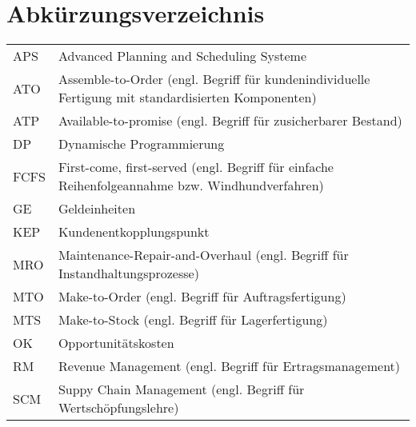\documentclass[a4paper,12pt,normalheadings,footexclude,headinclude,liststotoc,nochapterprefix,onecolumn,oneside,parskip,pointlessnumbers]{scrreprt}
\begin{document}
\chapter*{Abkürzungsverzeichnis}
\begin{table}[h!]
    \vspace*{-3mm}
    \hspace*{2mm}
  \renewcommand{\arraystretch}{1,5}
  \begin{flushleft}
    \begin{tabular}{lp{11.5cm}}  %
        APS & Advanced Planning and Scheduling Systeme \\
        ATO & Assemble-to-Order (engl. Begriff für kundenindividuelle Fertigung mit standardisierten Komponenten)\\
        ATP & Available-to-promise (engl. Begriff für zusicherbarer Bestand)\\
        DP  			 & Dynamische Programmierung\\
        FCFS & First-come, first-served (engl. Begriff für einfache Reihenfolgeannahme bzw. Windhundverfahren) \\
        GE & Geldeinheiten \\
        KEP & Kundenentkopplungspunkt \\
        MRO & Maintenance-Repair-and-Overhaul (engl. Begriff für Instandhaltungsprozesse)\\
     MTO & Make-to-Order (engl. Begriff für Auftragsfertigung) \\
     MTS & Make-to-Stock (engl. Begriff für Lagerfertigung)\\
     OK		    & Opportunitätskosten\\
     RM		    & Revenue Management (engl. Begriff für Ertragsmanagement)\\
     SCM & Suppy Chain Management (engl. Begriff für Wertschöpfungslehre) \\
	\end{tabular}
	\end{flushleft}
\end{table}

\end{document}
